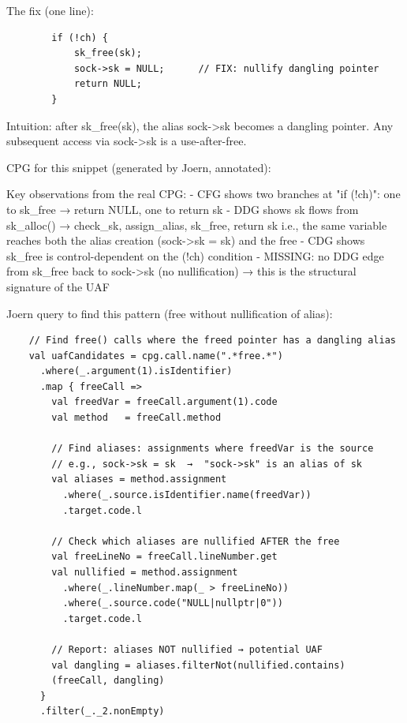     The fix (one line):
    \begin{verbatim}
        if (!ch) {
            sk_free(sk);
            sock->sk = NULL;      // FIX: nullify dangling pointer
            return NULL;
        }
    \end{verbatim}

    Intuition: after sk_free(sk), the alias sock->sk becomes a dangling pointer.
    Any subsequent access via sock->sk is a use-after-free.


    CPG for this snippet (generated by Joern, annotated):

    Key observations from the real CPG:
        - CFG shows two branches at "if (!ch)": one to sk_free → return NULL, one to return sk
        - DDG shows sk flows from sk_alloc() → {check_sk, assign_alias, sk_free, return sk}
          i.e., the same variable reaches both the alias creation (sock->sk = sk) and the free
        - CDG shows sk_free is control-dependent on the (!ch) condition
        - MISSING: no DDG edge from sk_free back to sock->sk (no nullification)
          → this is the structural signature of the UAF


    Joern query to find this pattern (free without nullification of alias):

    \begin{verbatim}
    // Find free() calls where the freed pointer has a dangling alias
    val uafCandidates = cpg.call.name(".*free.*")
      .where(_.argument(1).isIdentifier)
      .map { freeCall =>
        val freedVar = freeCall.argument(1).code
        val method   = freeCall.method

        // Find aliases: assignments where freedVar is the source
        // e.g., sock->sk = sk  →  "sock->sk" is an alias of sk
        val aliases = method.assignment
          .where(_.source.isIdentifier.name(freedVar))
          .target.code.l

        // Check which aliases are nullified AFTER the free
        val freeLineNo = freeCall.lineNumber.get
        val nullified = method.assignment
          .where(_.lineNumber.map(_ > freeLineNo))
          .where(_.source.code("NULL|nullptr|0"))
          .target.code.l

        // Report: aliases NOT nullified → potential UAF
        val dangling = aliases.filterNot(nullified.contains)
        (freeCall, dangling)
      }
      .filter(_._2.nonEmpty)
    \end{verbatim}

